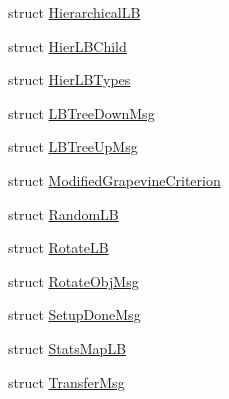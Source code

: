 \begin{DoxyCompactItemize}
struct \hyperlink{structvt_1_1vrt_1_1collection_1_1lb_1_1_hierarchical_l_b}{Hierarchical\+LB}
\item 
struct \hyperlink{structvt_1_1vrt_1_1collection_1_1lb_1_1_hier_l_b_child}{Hier\+L\+B\+Child}
\item 
struct \hyperlink{structvt_1_1vrt_1_1collection_1_1lb_1_1_hier_l_b_types}{Hier\+L\+B\+Types}
\item 
struct \hyperlink{structvt_1_1vrt_1_1collection_1_1lb_1_1_l_b_tree_down_msg}{L\+B\+Tree\+Down\+Msg}
\item 
struct \hyperlink{structvt_1_1vrt_1_1collection_1_1lb_1_1_l_b_tree_up_msg}{L\+B\+Tree\+Up\+Msg}
\item 
struct \hyperlink{structvt_1_1vrt_1_1collection_1_1lb_1_1_modified_grapevine_criterion}{Modified\+Grapevine\+Criterion}
\item 
struct \hyperlink{structvt_1_1vrt_1_1collection_1_1lb_1_1_random_l_b}{Random\+LB}
\item 
struct \hyperlink{structvt_1_1vrt_1_1collection_1_1lb_1_1_rotate_l_b}{Rotate\+LB}
\item 
struct \hyperlink{structvt_1_1vrt_1_1collection_1_1lb_1_1_rotate_obj_msg}{Rotate\+Obj\+Msg}
\item 
struct \hyperlink{structvt_1_1vrt_1_1collection_1_1lb_1_1_setup_done_msg}{Setup\+Done\+Msg}
\item 
struct \hyperlink{structvt_1_1vrt_1_1collection_1_1lb_1_1_stats_map_l_b}{Stats\+Map\+LB}
\item 
struct \hyperlink{structvt_1_1vrt_1_1collection_1_1lb_1_1_transfer_msg}{Transfer\+Msg}
\end{DoxyCompactItemize}
